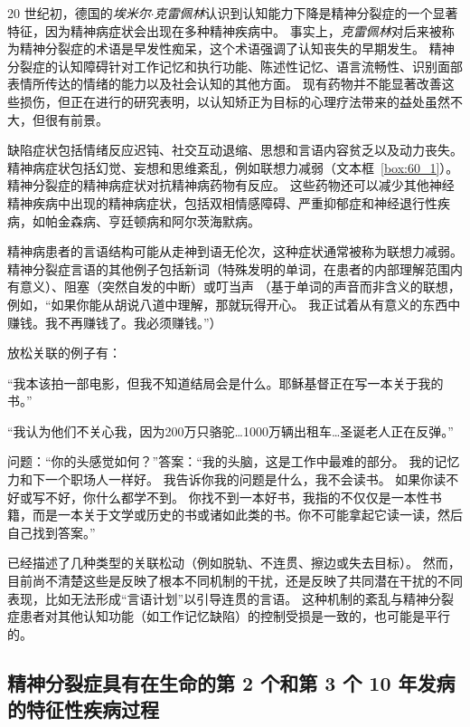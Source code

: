 20 世纪初，德国的\textit{埃米尔$\cdot$克雷佩林}认识到认知能力下降是精神分裂症的一个显著特征，因为精神病症状会出现在多种精神疾病中。
事实上，\textit{克雷佩林}对后来被称为精神分裂症的术语是早发性痴呆，这个术语强调了认知丧失的早期发生。
精神分裂症的认知障碍针对工作记忆和执行功能、陈述性记忆、语言流畅性、识别面部表情所传达的情绪的能力以及社会认知的其他方面。
现有药物并不能显著改善这些损伤，但正在进行的研究表明，以认知矫正为目标的心理疗法带来的益处虽然不大，但很有前景。


缺陷症状包括情绪反应迟钝、社交互动退缩、思想和言语内容贫乏以及动力丧失。
精神病症状包括幻觉、妄想和思维紊乱，例如联想力减弱（文本框~\ref{box:60_1}）。
精神分裂症的精神病症状对抗精神病药物有反应。
这些药物还可以减少其他神经精神疾病中出现的精神病症状，包括双相情感障碍、严重抑郁症和神经退行性疾病，如帕金森病、亨廷顿病和阿尔茨海默病。


\begin{proposition}[思维障碍] \label{box:60_1}
	
	\quad \quad 精神病患者的言语结构可能从走神到语无伦次，这种症状通常被称为联想力减弱。
	精神分裂症言语的其他例子包括新词（特殊发明的单词，在患者的内部理解范围内有意义）、阻塞（突然自发的中断）或叮当声
   （基于单词的声音而非含义的联想，例如，“如果你能从胡说八道中理解，那就玩得开心。
	我正试着从有意义的东西中赚钱。我不再赚钱了。我必须赚钱。”）
	
	\quad \quad 放松关联的例子有：
	
	\quad \quad “我本该拍一部电影，但我不知道结局会是什么。耶稣基督正在写一本关于我的书。”
	
	\quad \quad “我认为他们不关心我，因为200万只骆驼…1000万辆出租车…圣诞老人正在反弹。”
	
	\quad \quad 问题：“你的头感觉如何？”答案：“我的头脑，这是工作中最难的部分。
	我的记忆力和下一个职场人一样好。
	我告诉你我的问题是什么，我不会读书。
	如果你读不好或写不好，你什么都学不到。
	你找不到一本好书，我指的不仅仅是一本性书籍，而是一本关于文学或历史的书或诸如此类的书。你不可能拿起它读一读，然后自己找到答案。”
	
	\quad \quad 已经描述了几种类型的关联松动（例如脱轨、不连贯、擦边或失去目标）。
	然而，目前尚不清楚这些是反映了根本不同机制的干扰，还是反映了共同潜在干扰的不同表现，比如无法形成“言语计划”以引导连贯的言语。
	这种机制的紊乱与精神分裂症患者对其他认知功能（如工作记忆缺陷）的控制受损是一致的，也可能是平行的。

\end{proposition}




\subsection{精神分裂症具有在生命的第 2 个和第 3 个 10 年发病的特征性疾病过程}

